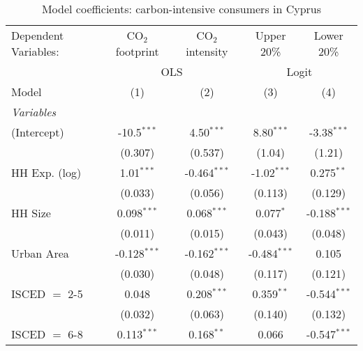 
\begin{table}[htbp!]
   \centering
   \small
   \begin{adjustbox}{width = 1\textwidth, max height = 0.95\textheight, center}
      \begin{threeparttable}[b]
         \caption{\label{tab:Logit_1_CYP} Model coefficients: carbon-intensive consumers in Cyprus}
         \begin{tabular}{lcccc}
            \tabularnewline \midrule \midrule
            Dependent Variables: & CO$_{2}$ footprint & CO$_{2}$ intensity & Upper 20\%     & Lower 20\%\\   
             & \multicolumn{2}{c}{OLS} & \multicolumn{2}{c}{Logit} \\ 
            Model                & (1)                & (2)                & (3)            & (4)\\  
            \midrule
            \emph{Variables}\\
            (Intercept)          & -10.5$^{***}$      & 4.50$^{***}$       & 8.80$^{***}$   & -3.38$^{***}$\\   
                                 & (0.307)            & (0.537)            & (1.04)         & (1.21)\\   
            HH Exp. (log)        & 1.01$^{***}$       & -0.464$^{***}$     & -1.02$^{***}$  & 0.275$^{**}$\\   
                                 & (0.033)            & (0.056)            & (0.113)        & (0.129)\\   
            HH Size              & 0.098$^{***}$      & 0.068$^{***}$      & 0.077$^{*}$    & -0.188$^{***}$\\   
                                 & (0.011)            & (0.015)            & (0.043)        & (0.048)\\   
            Urban Area           & -0.128$^{***}$     & -0.162$^{***}$     & -0.484$^{***}$ & 0.105\\   
                                 & (0.030)            & (0.048)            & (0.117)        & (0.121)\\   
            ISCED $=$ 2-5        & 0.048              & 0.208$^{***}$      & 0.359$^{**}$   & -0.544$^{***}$\\   
                                 & (0.032)            & (0.063)            & (0.140)        & (0.132)\\   
            ISCED $=$ 6-8        & 0.113$^{***}$      & 0.168$^{**}$       & 0.066          & -0.547$^{***}$\\   

\end{tabular}
\end{threeparttable}
\end{adjustbox}
\end{table}
